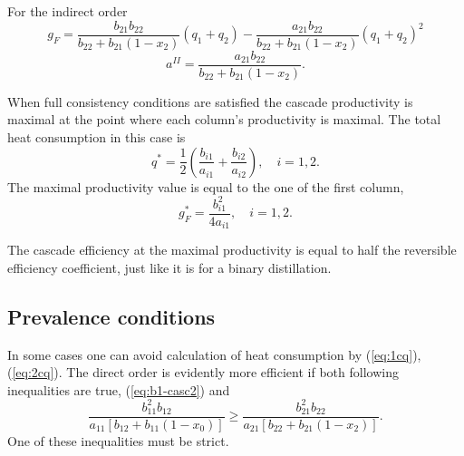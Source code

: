 \documentclass[12pt]{article}
\begin{document}
For the indirect order
\begin{equation}
g_F = \frac{b_{21}b_{22}}{b_{22}+b_{21}(1-x_2)}(q_1 + q_2) - \frac{a_{21}b_{22}}{b_{22} + b_{21}(1-x_2)}(q_1 + q_2)^2
\label{eq:gf-2v}
\end{equation}
\begin{equation}
a^{II} = \frac{a_{21}b_{22}}{b_{22} + b_{21}(1-x_2)}.
\label{eq:a-casc2}
\end{equation}

When full consistency conditions are satisfied the cascade productivity is maximal at the point where each column's productivity is maximal. The total heat consumption in this case is
\begin{equation}
q^* = \frac{1}{2}\left(\frac{b_{i1}}{a_{i1}} + \frac{b_{i2}}{a_{i2}}\right),\quad i=1,2.
\end{equation}
The maximal productivity value is equal to the one of the first column,
\begin{equation}
g_F^* = \frac{b_{i1}^2}{4a_{i1}},\quad i=1,2.
\end{equation}

The cascade efficiency at the maximal productivity is equal to half the reversible efficiency coefficient, just like it is for a binary distillation.

\subsection {Prevalence conditions}
In some cases one can avoid calculation of heat consumption by (\ref {eq:1cq}), (\ref {eq:2cq}). The direct order is evidently more efficient if both following inequalities are true, (\ref{eq:b1-casc2}) and
\begin{equation}
\frac{b_{11}^2b_{12}}{a_{11}\left[b_{12}+b_{11}(1-x_0)\right]} \geq \frac{b_{21}^2b_{22}}{a_{21}\left[b_{22}+b_{21}(1-x_2)\right]}.
\label{eq:prev}
\end{equation}
One of these inequalities must be strict.
\end{document}
